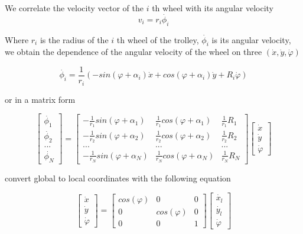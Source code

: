 \documentclass[oneside,final,14pt]{extreport}
\begin{document}
We correlate the velocity vector of the $ i $ th wheel with its angular velocity
\begin{equation}
v_{i}
=
r_{i}\dot{\phi_{i}}
\end{equation}

Where $ r_ {i} $ is the radius of the $ i $ th wheel of the trolley, $ \dot {\phi_ {i}} $ is its angular velocity, we obtain the dependence of the angular velocity of the wheel on three  $(\dot{x},\dot{y},\dot{\varphi})$

\begin{equation}
\dot{\phi_{i}}
=
\frac{1}{r_{i}}
(
-sin(\varphi +\alpha_{i})\dot{x}
+cos(\varphi +\alpha_{i})\dot{y}
+
R_{i}\dot{\varphi}
)
\end{equation}

or in a matrix form 

\begin{equation}
\begin{bmatrix}
\dot{\phi_{1}} \\
\dot{\phi_{2}} \\
...\\
\dot{\phi_{N}}
\end{bmatrix}
=
\begin{bmatrix}
-\frac{1}{r_{1}}sin(\varphi +\alpha_{1}) &
\frac{1}{r_{1}}cos(\varphi +\alpha_{1}) &
\frac{1}{r_{1}}R_{1}
\\
-\frac{1}{r_{2}}sin(\varphi +\alpha_{2}) &
\frac{1}{r_{2}}cos(\varphi +\alpha_{2}) &
\frac{1}{r_{2}}R_{2}
\\
... & ... & ...
\\
-\frac{1}{r_{N}}sin(\varphi +\alpha_{N}) &
\frac{1}{r_{N}}cos(\varphi +\alpha_{N}) &
\frac{1}{r_{N}}R_{N}
\end{bmatrix}
\begin{bmatrix}
\dot{x} \\
\dot{y} \\
\dot{\varphi}
\end{bmatrix}
\end{equation}

convert global to local coordinates with the following equation

\begin{equation}
\begin{bmatrix}
\dot{x} \\
\dot{y} \\
\dot{\varphi}
\end{bmatrix}
=
\begin{bmatrix}
cos(\varphi) & 0 & 0 \\
0 & cos(\varphi) & 0 \\
0 & 0 & 1
\end{bmatrix}
\begin{bmatrix}
\dot{x_{l}} \\
\dot{y_{l}} \\
\dot{\varphi}
\end{bmatrix}
\end{equation}
\end{document}

